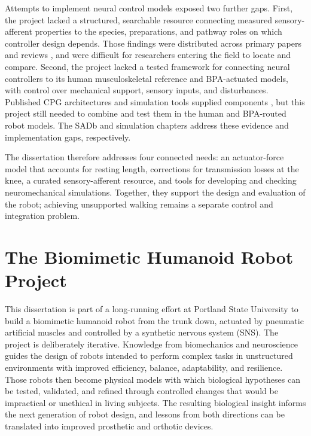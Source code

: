 Attempts to implement neural control models exposed two further gaps. First, the project lacked a structured, searchable resource connecting measured sensory-afferent properties to the species, preparations, and pathway roles on which controller design depends. Those findings were distributed across primary papers and reviews \citep{van_de_crommert_review_1998, windhorst_muscle_2007, windhorst_spinal_2022}, and were difficult for researchers entering the field to locate and compare. Second, the project lacked a tested framework for connecting neural controllers to its human musculoskeletal reference and BPA-actuated models, with control over mechanical support, sensory inputs, and disturbances. Published CPG architectures and simulation tools supplied components \citep{rybak_modelling_2006, mccrea_organization_2008, markin_afferent_2010, nourse_sns_2023}, but this project still needed to combine and test them in the human and BPA-routed robot models. The SADb and simulation chapters address these evidence and implementation gaps, respectively.

The dissertation therefore addresses four connected needs: an actuator-force model that accounts for resting length, corrections for transmission losses at the knee, a curated sensory-afferent resource, and tools for developing and checking neuromechanical simulations. Together, they support the design and evaluation of the robot; achieving unsupported walking remains a separate control and integration problem.

\section{The Biomimetic Humanoid Robot Project}\label{sec:project}

This dissertation is part of a long-running effort at Portland State University to build a biomimetic humanoid robot from the trunk down, actuated by pneumatic artificial muscles and controlled by a synthetic nervous system (SNS). The project is deliberately iterative. Knowledge from biomechanics and neuroscience guides the design of robots intended to perform complex tasks in unstructured environments with improved efficiency, balance, adaptability, and resilience. Those robots then become physical models with which biological hypotheses can be tested, validated, and refined through controlled changes that would be impractical or unethical in living subjects. The resulting biological insight informs the next generation of robot design, and lessons from both directions can be translated into improved prosthetic and orthotic devices.

